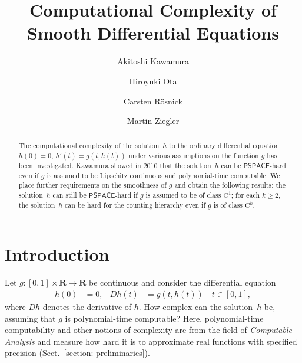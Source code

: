 \documentclass{lmcs}
\theoremstyle{definition}
\theoremstyle{remark}
\newcommand{\R}{\mathbf R}
\newcommand{\D}{D}
\newcommand{\classPSPACE}{\mathsf{PSPACE}}
\newcommand{\classC}{\mathrm C}
\begin{document}
\title[Computational Complexity of Smooth Differential Equations]{Computational Complexity of\\Smooth Differential Equations}

\author[A.~Kawamura]{Akitoshi Kawamura}  %
\author[H.~Ota]{Hiroyuki Ota}            %
\author[C.~R\"osnick]{Carsten R\"osnick} %
\author[M.~Ziegler]{Martin Ziegler}      %

\begin{abstract}
The computational complexity of the solution~$h$ to 
the ordinary differential equation 
$h(0)=0$, $h'(t) = g(t, h(t))$ 
under various assumptions on the function $g$
has been investigated. 
Kawamura showed in 2010 that the solution~$h$ can be $\classPSPACE$-hard
even if $g$ is assumed to be Lipschitz continuous and polynomial-time computable. 
We place further requirements on the smoothness of $g$ 
and obtain the following results: 
the solution~$h$ can still be $\classPSPACE$-hard
if $g$ is assumed to be of class $\classC ^1$; 
for each $k \geq 2$, 
the solution~$h$ can be hard for the counting hierarchy 
even if $g$ is of class $\classC ^k$. 
\end{abstract}

\maketitle

\section{Introduction}

Let $g \colon [0,1] \times \R \to \R$ be continuous 
and consider the differential equation 
\begin{align}
 \label{eq:ode}
 h(0) & = 0, &
 \D h(t) & = g(t,h(t)) \quad t \in [0,1], 
\end{align}
where $\D h$ denotes the derivative of $h$. 
How complex can the solution~$h$ be, 
assuming that $g$ is polynomial-time computable? 
Here, polynomial-time computability 
and other notions of complexity 
are from the field of 
\emph{Computable Analysis} 
\cite{ko1991complexity,weihrauch00:_comput_analy}
and measure how hard it is to 
approximate real functions with specified precision 
(Sect.~\ref{section: preliminaries}). 
\end{document}
